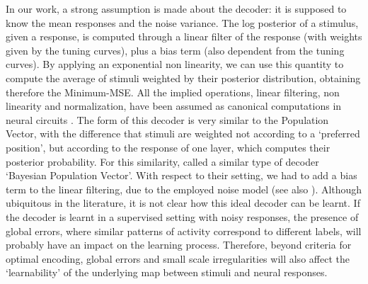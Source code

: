 \documentclass[a4paper]{article}%
\begin{document}
In our work, a strong assumption is made about the decoder: it is supposed
to know the mean responses and the noise variance. The log posterior of a
stimulus, given a response, is computed through a linear filter of the
response (with weights given by the tuning curves), plus a bias term (also
dependent from the tuning curves). By applying an exponential non linearity,
we can use this quantity to compute the average of stimuli weighted by their
posterior distribution, obtaining therefore the Minimum-MSE. All the implied
operations, linear filtering, non linearity and normalization, have been
assumed as canonical computations in neural circuits
\cite[]{Deneve1999ReadingObservers,Kouh2008AOperations,Carandini2012NormalizationComputation}.
The form of this decoder is very similar to the Population Vector, with the
difference that stimuli are weighted not according to a `preferred position',
but according to the response of one layer, which computes their posterior
probability. For this similarity, \cite{Ganguli2014EfficientPopulations}
called a similar type of decoder `Bayesian Population Vector'. With respect to their setting, we had to add a bias term to the
linear filtering, due to the employed noise model (see also
\cite{Ma2006BayesianCodes,Jazayeri2006OptimalPopulations}). Although
ubiquitous in the literature, it is not clear how this ideal decoder can be
learnt. If the decoder is learnt in a supervised setting with noisy responses,
the presence of global errors, where similar patterns of activity correspond
to different labels, will probably have an impact on the learning process.
Therefore, beyond criteria for optimal encoding, global errors and small scale
irregularities will also affect the `learnability' of the underlying map
between stimuli and neural responses.
\end{document}
